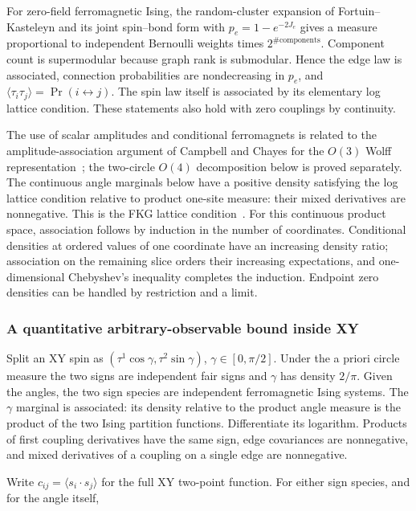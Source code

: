 For zero-field ferromagnetic Ising, the random-cluster expansion
of Fortuin--Kasteleyn and its joint spin--bond form
\cite{FortuinKasteleyn1972,EdwardsSokal1988} with \(p_e=1-e^{-2J_e}\) gives a measure proportional to independent Bernoulli weights times \(2^{\#\mathrm{components}}\). Component count is supermodular because graph rank is submodular. Hence the edge law is associated, connection probabilities are nondecreasing in \(p_e\), and \(\langle\tau_i\tau_j\rangle=\Pr(i\leftrightarrow j)\). The spin law itself is associated by its elementary log lattice condition. These statements also hold with zero couplings by continuity.

The use of scalar amplitudes and conditional ferromagnets is related to
the amplitude-association argument of Campbell and Chayes for the $O(3)$
Wolff representation~\cite{CampbellChayes1998}; the two-circle $O(4)$
decomposition below is proved separately. The continuous angle marginals
below have a positive density satisfying the log lattice condition relative to product one-site measure: their mixed derivatives are nonnegative. This is the FKG lattice condition~\cite{FortuinKasteleynGinibre1971}.
For this continuous product space, association follows by induction in
the number of coordinates. Conditional densities at ordered values of one coordinate have an increasing density ratio; association on the remaining slice orders their increasing expectations, and one-dimensional Chebyshev's inequality completes the induction. Endpoint zero densities can be handled by restriction and a limit.

\subsubsection{A quantitative arbitrary-observable bound inside XY}\label{pre:part-11-2}

Split an XY spin as
\((\tau^1\cos\gamma,\tau^2\sin\gamma)\), \(\gamma\in[0,\pi/2]\). Under
the a priori circle measure the two signs are independent fair signs and
\(\gamma\) has density \(2/\pi\). Given the angles, the two sign species are
independent ferromagnetic Ising systems. The \(\gamma\) marginal is associated:
its density relative to the product angle measure is the product of the
two Ising partition functions. Differentiate its logarithm. Products of
first coupling derivatives have the same sign, edge covariances are
nonnegative, and mixed derivatives of a coupling on a single edge are
nonnegative.

Write \(c_{ij}=\langle s_i\cdot s_j\rangle\) for the full XY two-point function. For either sign species, and for the angle itself,


